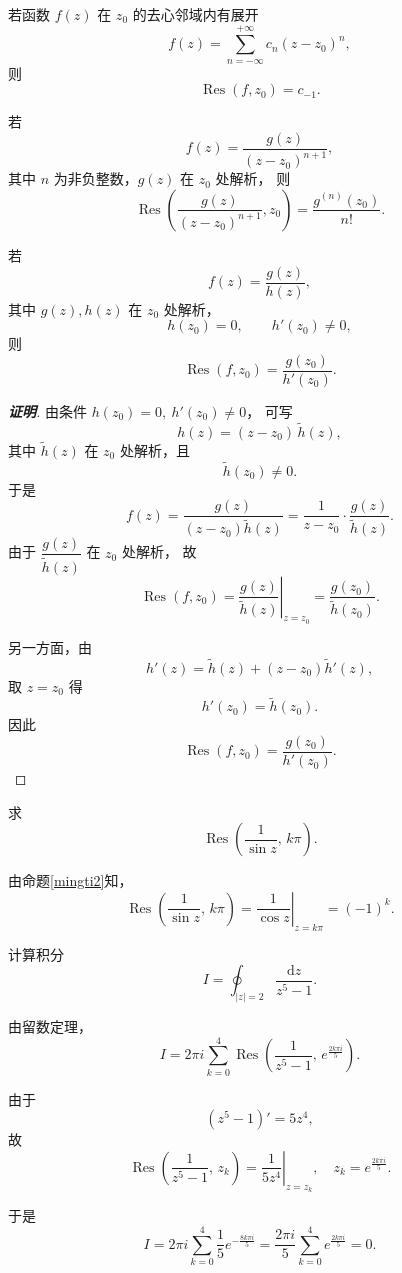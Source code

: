 \documentclass[openany,oneside]{ctexbook}
\begin{document}
\begin{theorem}
若函数 $f(z)$ 在 $z_0$ 的去心邻域内有展开
\[
f(z)=\sum_{n=-\infty}^{+\infty} c_n (z-z_0)^n,
\]
则
\[
\operatorname{Res}(f,z_0)=c_{-1}.
\]
\end{theorem}
\begin{proposition}
若
\[
f(z)=\frac{g(z)}{(z-z_0)^{n+1}},
\]
其中 $n$ 为非负整数，$g(z)$ 在 $z_0$ 处解析，
则
\[
\operatorname{Res}\!\left(\frac{g(z)}{(z-z_0)^{n+1}},z_0\right)
=\frac{g^{(n)}(z_0)}{n!}.
\]
\end{proposition}
\begin{proposition}\label{mingti2}
若
\[
f(z)=\frac{g(z)}{h(z)},
\]
其中 $g(z),h(z)$ 在 $z_0$ 处解析，
\[
h(z_0)=0,\qquad h'(z_0)\neq 0,
\]
则
\[
\operatorname{Res}(f,z_0)=\frac{g(z_0)}{h'(z_0)}.
\]
\end{proposition}
\begin{proof}[\textbf{证明}]
由条件 $h(z_0)=0,\ h'(z_0)\neq 0$，
可写
\[
h(z)=(z-z_0)\,\tilde h(z),
\]
其中 $\tilde h(z)$ 在 $z_0$ 处解析，且
\[
\tilde h(z_0)\neq 0.
\]
于是
\[
f(z)=\frac{g(z)}{(z-z_0)\tilde h(z)}
=\frac{1}{z-z_0}\cdot\frac{g(z)}{\tilde h(z)}.
\]
由于 $\dfrac{g(z)}{\tilde h(z)}$ 在 $z_0$ 处解析，
故
\[
\operatorname{Res}(f,z_0)
=\left.\frac{g(z)}{\tilde h(z)}\right|_{z=z_0}
=\frac{g(z_0)}{\tilde h(z_0)}.
\]

另一方面，由
\[
h'(z)=\tilde h(z)+(z-z_0)\tilde h'(z),
\]
取 $z=z_0$ 得
\[
h'(z_0)=\tilde h(z_0).
\]
因此
\[
\operatorname{Res}(f,z_0)=\frac{g(z_0)}{h'(z_0)}.
\]
\end{proof}
\begin{example}
求
\[
\operatorname{Res}\!\left(\frac{1}{\sin z},\,k\pi\right).
\]
\end{example}

\begin{solution}
由命题\ref{mingti2}知，
\[
\operatorname{Res}\!\left(\frac{1}{\sin z},\,k\pi\right)
=\left.\frac{1}{\cos z}\right|_{z=k\pi}
=(-1)^k.
\]
\end{solution}
\begin{example}
计算积分
\[
I=\oint_{|z|=2}\frac{\mathrm{d}z}{z^5-1}.
\]
\end{example}

\begin{solution}
由留数定理，
\[
I
=2\pi i \sum_{k=0}^{4}
\operatorname{Res}\!\left(\frac{1}{z^5-1},\,e^{\frac{2k\pi i}{5}}\right).
\]

由于
\[
(z^5-1)'=5z^4,
\]
故
\[
\operatorname{Res}\!\left(\frac{1}{z^5-1},\,z_k\right)
=\left.\frac{1}{5z^4}\right|_{z=z_k},
\quad z_k=e^{\frac{2k\pi i}{5}}.
\]

于是
\[
I
=2\pi i \sum_{k=0}^{4}
\frac{1}{5}e^{-\frac{8k\pi i}{5}}
=\frac{2\pi i}{5}\sum_{k=0}^{4} e^{\frac{2k\pi i}{5}}
=0.
\]
\end{solution}
\end{document}
